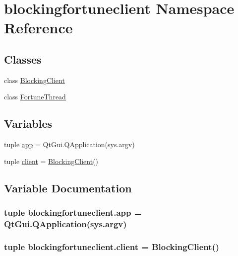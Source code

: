 \hypertarget{namespaceblockingfortuneclient}{}\section{blockingfortuneclient Namespace Reference}
\label{namespaceblockingfortuneclient}
\subsection*{Classes}
\begin{DoxyCompactItemize}
\item 
class \hyperlink{classblockingfortuneclient_1_1BlockingClient}{Blocking\+Client}
\item 
class \hyperlink{classblockingfortuneclient_1_1FortuneThread}{Fortune\+Thread}
\end{DoxyCompactItemize}
\subsection*{Variables}
\begin{DoxyCompactItemize}
\item 
tuple \hyperlink{namespaceblockingfortuneclient_a447cb2d6f49188f8135a503acfbd4c95}{app} = Qt\+Gui.\+Q\+Application(sys.\+argv)
\item 
tuple \hyperlink{namespaceblockingfortuneclient_af308d67147e75295ecdb5550f8e93f3c}{client} = \hyperlink{classblockingfortuneclient_1_1BlockingClient}{Blocking\+Client}()
\end{DoxyCompactItemize}


\subsection{Variable Documentation}
\hypertarget{namespaceblockingfortuneclient_a447cb2d6f49188f8135a503acfbd4c95}{}
\subsubsection[{app}]{\setlength{\rightskip}{0pt plus 5cm}tuple blockingfortuneclient.\+app = Qt\+Gui.\+Q\+Application(sys.\+argv)}\label{namespaceblockingfortuneclient_a447cb2d6f49188f8135a503acfbd4c95}
\hypertarget{namespaceblockingfortuneclient_af308d67147e75295ecdb5550f8e93f3c}{}
\subsubsection[{client}]{\setlength{\rightskip}{0pt plus 5cm}tuple blockingfortuneclient.\+client = {\bf Blocking\+Client}()}\label{namespaceblockingfortuneclient_af308d67147e75295ecdb5550f8e93f3c}
